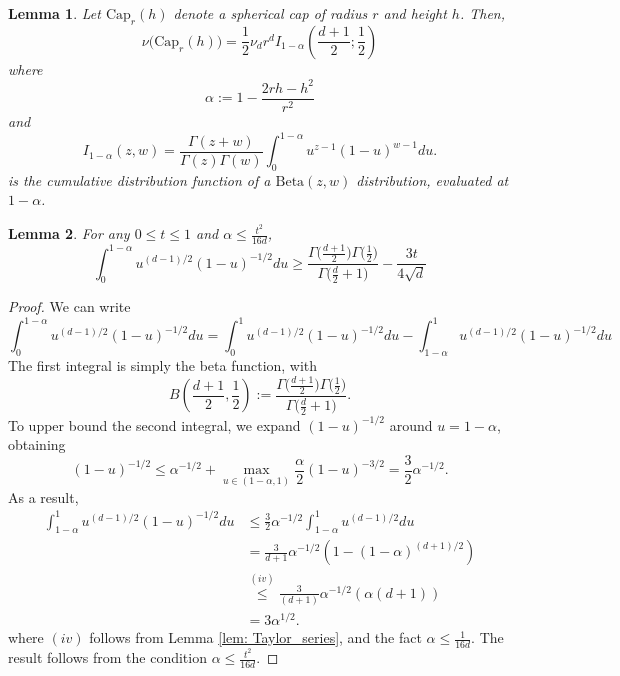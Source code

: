 \documentclass{article}
\newcommand{\1}{\mathbf{1}}
\theoremstyle{aldenthm}
\newtheorem{lemma}{Lemma}
\theoremstyle{aldenrmrk}
\begin{document}
\begin{lemma}
	\label{lem: volume_of_spherical_cap}
	Let $\mathrm{Cap}_r(h)$ denote a spherical cap of radius $r$ and height $h$. Then, 
	\begin{equation*}
	\nu\bigl( \mathrm{Cap}_r(h)  \bigr) = \frac{1}{2} \nu_d r^d I_{1 - \alpha}(\frac{d + 1}{2}; \frac{1}{2})
	\end{equation*}
	where
	\begin{equation*}
	\alpha := 1 - \frac{2 r h - h^2}{r^2}
	\end{equation*}
	and
	\begin{equation*}
	I_{1 - \alpha}(z,w) = \frac{\Gamma(z + w)}{\Gamma(z) \Gamma(w)} \int_{0}^{1 - \alpha} u^{z - 1} (1 - u)^{w - 1} du.
	\end{equation*}
	is the cumulative distribution function of a $\mathrm{Beta}(z,w)$ distribution, evaluated at $1 - \alpha$. 
\end{lemma}

\begin{lemma}
	\label{lem: beta_integral}
	For any $0 \leq t \leq 1$ and $\alpha \leq \frac{t^2}{16 d}$,
	\begin{equation*}
	\int_{0}^{1 - \alpha}u^{(d-1)/2}(1 - u)^{-1/2}du \geq \frac{\Gamma\bigl(\frac{d + 1}{2}\bigr)\Gamma\bigl(\frac{1}{2}\bigr)}{ \Gamma\bigl(\frac{d}{2}+ 1\bigr)} - \frac{3t}{4\sqrt{d}}
	\end{equation*}
\end{lemma}
\begin{proof}
	We can write 
	\begin{equation*}
	\int_{0}^{1 - \alpha}u^{(d-1)/2}(1 - u)^{-1/2}du = \int_{0}^{1}u^{(d-1)/2}(1 - u)^{-1/2}du - \int_{1 - \alpha}^{1}u^{(d-1)/2}(1 - u)^{-1/2}du
	\end{equation*}
	The first integral is simply the beta function, with
	\begin{equation*}
	B(\frac{d+1}{2},\frac{1}{2}) := \frac{\Gamma\bigl(\frac{d + 1}{2}\bigr)\Gamma\bigl(\frac{1}{2}\bigr)}{ \Gamma\bigl(\frac{d}{2}+ 1\bigr)}.
	\end{equation*}
	To upper bound the second integral, we expand $(1 - u)^{-1/2}$ around $u = 1 - \alpha$, obtaining
	\begin{equation*}
	(1 - u)^{-1/2} \leq \alpha^{-1/2} + \max_{u \in (1 - \alpha, 1)} \frac{\alpha}{2} (1 - u)^{-3/2} = \frac{3}{2}\alpha^{-1/2}.
	\end{equation*}
	As a result,
	\begin{align*}
	\int_{1 - \alpha}^{1}u^{(d-1)/2}(1 - u)^{-1/2}du & \leq \frac{3}{2}\alpha^{-1/2} \int_{1 - \alpha}^{1}u^{(d-1)/2}du \\
	& = \frac{3}{d+1}\alpha^{-1/2} \left(1 - (1 - \alpha)^{(d + 1)/2}\right) \\
	& \overset{(iv)}{\leq} \frac{3}{(d+1)}\alpha^{-1/2} (\alpha(d + 1)) \\
	& =  3\alpha^{1/2}.
	\end{align*}
	where $(iv)$ follows from Lemma \ref{lem: Taylor_series}, and the fact $\alpha \leq \frac{1}{16d}$. The result follows from the condition $\alpha \leq \frac{t^2}{16d}$. 
\end{proof}
\end{document}
